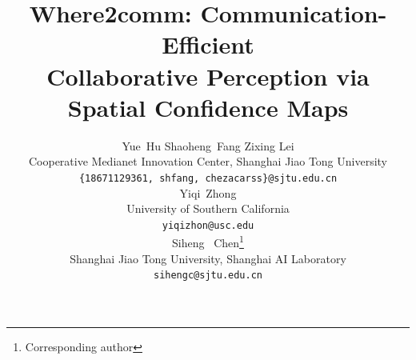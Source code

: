 \documentclass{article}
\author{%
  Yue~Hu \hspace{1.75cm} Shaoheng~Fang \hspace{1.75cm} Zixing Lei \\
  Cooperative Medianet Innovation Center, Shanghai Jiao Tong University \\
  \texttt{\{18671129361, shfang, chezacarss\}@sjtu.edu.cn} \\
  \AND
  Yiqi~Zhong \\
  University of Southern California \\
  \texttt{yiqizhon@usc.edu} \\
  \And
  Siheng ~Chen\thanks{Corresponding author} \\
  Shanghai Jiao Tong University,  Shanghai AI Laboratory \\
  \texttt{sihengc@sjtu.edu.cn}
}
\begin{document}
\title{ Where2comm: Communication-Efficient \\ Collaborative Perception via Spatial Confidence Maps}
\maketitle








\clearpage
{\small


}
\clearpage


\clearpage
% 
% 

% 

% 
% 

% 
% 
\end{document}
